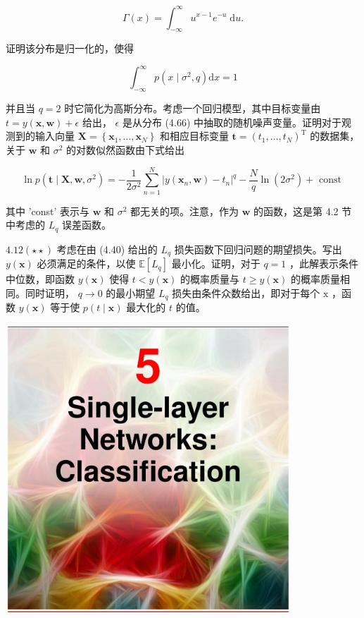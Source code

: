 \documentclass[10pt]{article}
\begin{document}
\[
\Gamma \left( x\right)  = {\int }_{-\infty }^{\infty }{u}^{x - 1}{e}^{-u}\mathrm{\;d}u. \tag{4.67}
\]

证明该分布是归一化的，使得

\[
{\int }_{-\infty }^{\infty }p\left( {x \mid  {\sigma }^{2},q}\right) \mathrm{d}x = 1 \tag{4.68}
\]

并且当 \(q = 2\) 时它简化为高斯分布。考虑一个回归模型，其中目标变量由 \(t = y\left( {\mathbf{x},\mathbf{w}}\right)  + \epsilon\) 给出， \(\epsilon\) 是从分布 (4.66) 中抽取的随机噪声变量。证明对于观测到的输入向量 \(\mathbf{X} = \left\{  {{\mathbf{x}}_{1},\ldots ,{\mathbf{x}}_{N}}\right\}\) 和相应目标变量 \(\mathbf{t} = {\left( {t}_{1},\ldots ,{t}_{N}\right) }^{\mathrm{T}}\) 的数据集，关于 \(\mathbf{w}\) 和 \({\sigma }^{2}\) 的对数似然函数由下式给出

\[
\ln p\left( {\mathbf{t} \mid  \mathbf{X},\mathbf{w},{\sigma }^{2}}\right)  =  - \frac{1}{2{\sigma }^{2}}\mathop{\sum }\limits_{{n = 1}}^{N}{\left| y\left( {\mathbf{x}}_{n},\mathbf{w}\right)  - {t}_{n}\right| }^{q} - \frac{N}{q}\ln \left( {2{\sigma }^{2}}\right)  + \text{ const } \tag{4.69}
\]

其中 'const' 表示与 \(\mathbf{w}\) 和 \({\sigma }^{2}\) 都无关的项。注意，作为 \(\mathbf{w}\) 的函数，这是第 4.2 节中考虑的 \({L}_{q}\) 误差函数。

\({4.12}\left( {\star  \star  }\right)\) 考虑在由 (4.40) 给出的 \({L}_{q}\) 损失函数下回归问题的期望损失。写出 \(y\left( \mathbf{x}\right)\) 必须满足的条件，以使 \(\mathbb{E}\left\lbrack  {L}_{q}\right\rbrack\) 最小化。证明，对于 \(q = 1\) ，此解表示条件中位数，即函数 \(y\left( \mathbf{x}\right)\) 使得 \(t < y\left( \mathbf{x}\right)\) 的概率质量与 \(t \geq  y\left( \mathbf{x}\right)\) 的概率质量相同。同时证明， \(q \rightarrow  0\) 的最小期望 \({L}_{q}\) 损失由条件众数给出，即对于每个 \(\mathrm{x}\) ，函数 \(y\left( \mathbf{x}\right)\) 等于使 \(p\left( {t \mid  \mathbf{x}}\right)\) 最大化的 \(t\) 的值。

\begin{center}
\includegraphics[max width=0.8\textwidth]{images/0194e279-9b28-703a-88f4-c3ac21e2010d_150_474_349_1074_1087_0.jpg}
\end{center}
\hspace*{3em} 
\end{document}
